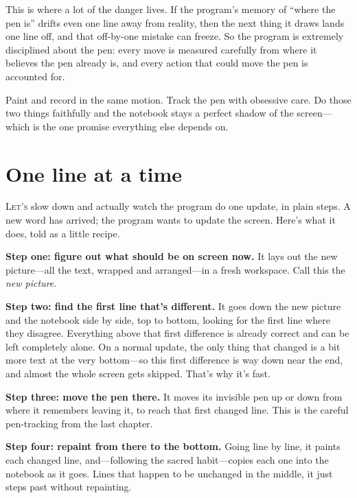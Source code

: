 \documentclass[11pt,twoside]{book}
\begin{document}
This is where a lot of the danger lives. If the program's memory of ``where
the pen is'' drifts even one line away from reality, then the next thing it
draws lands one line off, and that off-by-one mistake can freeze. So the
program is extremely disciplined about the pen: every move is measured
carefully from where it believes the pen already is, and every action that
could move the pen is accounted for.

\begin{insight}
Paint and record in the same motion. Track the pen with obsessive care. Do
those two things faithfully and the notebook stays a perfect shadow of the
screen---which is the one promise everything else depends on.
\end{insight}

\chapter{One line at a time}
\lettrine{L}{et's} slow down and actually watch the program do one update, in
plain steps. A new word has arrived; the program wants to update the screen.
Here's what it does, told as a little recipe.

\textbf{Step one: figure out what should be on screen now.} It lays out the
new picture---all the text, wrapped and arranged---in a fresh workspace. Call
this the \emph{new picture}.

\textbf{Step two: find the first line that's different.} It goes down the
new picture and the notebook side by side, top to bottom, looking for the
first line where they disagree. Everything above that first difference is
already correct and can be left completely alone. On a normal update, the
only thing that changed is a bit more text at the very bottom---so this first
difference is way down near the end, and almost the whole screen gets
skipped. That's why it's fast.

\textbf{Step three: move the pen there.} It moves its invisible pen up or
down from where it remembers leaving it, to reach that first changed line.
This is the careful pen-tracking from the last chapter.

\textbf{Step four: repaint from there to the bottom.} Going line by line, it
paints each changed line, and---following the sacred habit---copies each one
into the notebook as it goes. Lines that happen to be unchanged in the
middle, it just steps past without repainting.
\end{document}
